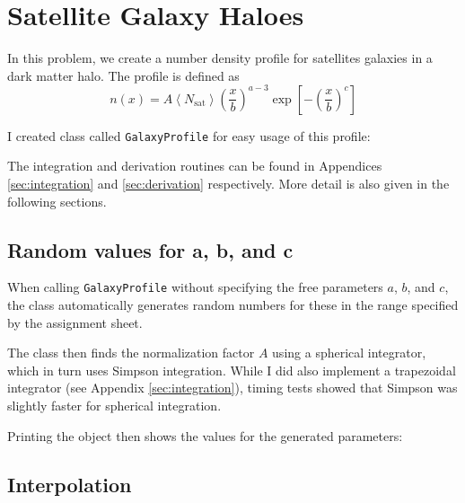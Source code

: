 \newpage
\section{Satellite Galaxy Haloes}

In this problem, we create a number density profile for satellites galaxies in a dark matter halo. The profile is defined as
\begin{equation}
    n ( x ) = A \left\langle N _ { \mathrm { sat } } \right\rangle \left( \frac { x } { b } \right) ^ { a - 3 } \exp \left[ - \left( \frac { x } { b } \right) ^ { c } \right]
    \label{eq:n(x)}
\end{equation}

I created class called \texttt{GalaxyProfile} for easy usage of this profile:



The integration and derivation routines can be found in Appendices \ref{sec:integration} and \ref{sec:derivation} respectively. More detail is also given in the following sections.


    \newpage
    \subsection{Random values for a, b, and c}

    When calling \texttt{GalaxyProfile} without specifying the free parameters $a$, $b$, and $c$, the class automatically generates random numbers for these in the range specified by the assignment sheet. 

    The class then finds the normalization factor $A$ using a spherical integrator, which in turn uses Simpson integration. While I did also implement a trapezoidal integrator (see Appendix \ref{sec:integration}), timing tests showed that Simpson was slightly faster for spherical integration.

    


    Printing the object then shows the values for the generated parameters:

    
    

    

    \newpage
    \subsection{Interpolation}

